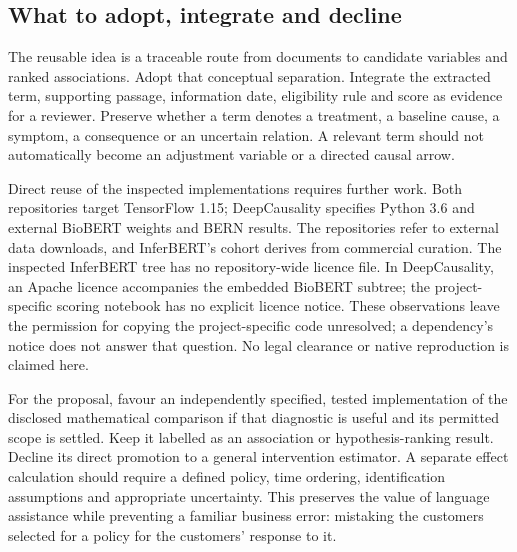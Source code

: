 \subsection{What to adopt, integrate and decline}

The reusable idea is a traceable route from documents to candidate
variables and ranked associations. Adopt that conceptual separation.
Integrate the extracted term, supporting passage, information date,
eligibility rule and score as evidence for a reviewer. Preserve whether a
term denotes a treatment, a baseline cause, a symptom, a consequence or an
uncertain relation. A relevant term should not automatically become an
adjustment variable or a directed causal arrow.

Direct reuse of the inspected implementations requires further work. Both
repositories target TensorFlow 1.15; DeepCausality specifies Python 3.6 and
external BioBERT weights and BERN results. The repositories refer to external
data downloads, and InferBERT's cohort derives from commercial curation.
The inspected InferBERT tree has no repository-wide licence file. In
DeepCausality, an Apache licence accompanies the embedded BioBERT subtree;
the project-specific scoring notebook has no explicit licence notice.
These observations leave the permission for copying the project-specific
code unresolved; a dependency's notice does not answer that question.
No legal clearance or native reproduction is claimed here.
\citep{closure30inferbertcode,closure30deepcausalitycode}

For the proposal, favour an independently specified, tested implementation
of the disclosed mathematical comparison if that diagnostic is useful and
its permitted scope is settled. Keep it labelled as an association or
hypothesis-ranking result. Decline its direct promotion to a general
intervention estimator. A separate effect calculation should require a
defined policy, time ordering, identification assumptions and appropriate
uncertainty. This preserves the value of language assistance while preventing
a familiar business error: mistaking the customers selected for a policy
for the customers' response to it.
